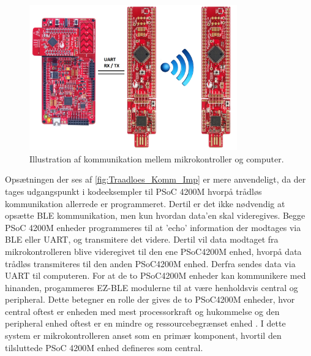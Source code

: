 \begin{figure}[H]
	\centering
	\includegraphics[width=0.8\textwidth]{figures/Traadloes_Komm_Imp}
	\caption{Illustration af kommunikation mellem mikrokontroller og computer.} 
	\label{fig:Traadloes_Komm_Imp}
\end{figure}

Opsætningen der ses af \autoref{fig:Traadloes_Komm_Imp} er mere anvendeligt, da der tages udgangspunkt i kodeeksempler til PSoC 4200M hvorpå trådløs kommunikation allerrede er programmeret. Dertil er det ikke nødvendig at opsætte BLE kommunikation, men kun hvordan data'en skal videregives. 
Begge PSoC 4200M enheder programmeres til at 'echo' information der modtages via BLE eller UART, og transmitere det videre. Dertil vil data modtaget fra mikrokontrolleren blive videregivet til den ene PSoC4200M enhed, hvorpå data trådløs transmiteres til den anden PSoC4200M enhed. Derfra sendes data via UART til computeren. 
For at de to PSoC4200M enheder kan kommunikere med hinanden, progammeres EZ-BLE modulerne til at være henholdsvis central og peripheral. Dette betegner en rolle der gives de to PSoC4200M enheder, hvor central oftest er enheden med mest processorkraft og hukommelse og den peripheral enhed oftest er en mindre og ressourcebegrænset enhed \citep{townsend2014}. I dette system er mikrokontrolleren anset som en primær komponent, hvortil den tilsluttede PSoC 4200M enhed defineres som central.   